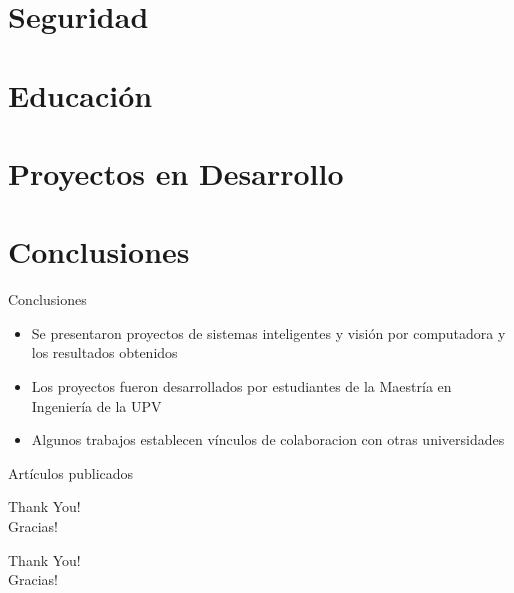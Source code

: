 \documentclass[aspectratio=169,compress]{beamer}
\begin{document}
\section{Seguridad} %






\section{Educación} %






\section{Proyectos en Desarrollo} %





\section{Conclusiones}
\begin{frame}{Conclusiones}
\begin{itemize}
\item Se presentaron proyectos de sistemas inteligentes y visión por computadora y los resultados obtenidos
\item Los proyectos fueron desarrollados por estudiantes de la Maestría en Ingeniería de la UPV
\item Algunos trabajos establecen vínculos de colaboracion con otras universidades
\end{itemize}
\end{frame}




\renewcommand*{\bibfont}{\tiny}
\begin{frame}[allowframebreaks]{Artículos publicados}
    \printbibliography[title=Artículos publicados,keyword=primary]
\end{frame}

\begin{frame}%
\begin{center}
\Huge Thank You! \\
\Huge Gracias! \\
\end{center}
\end{frame}

\begin{frame}%
\begin{center}
{\fontsize{40}{50}\selectfont Thank You!}\\
{\fontsize{40}{50}\selectfont Gracias!}
\end{center}
\end{frame}
\end{document}
